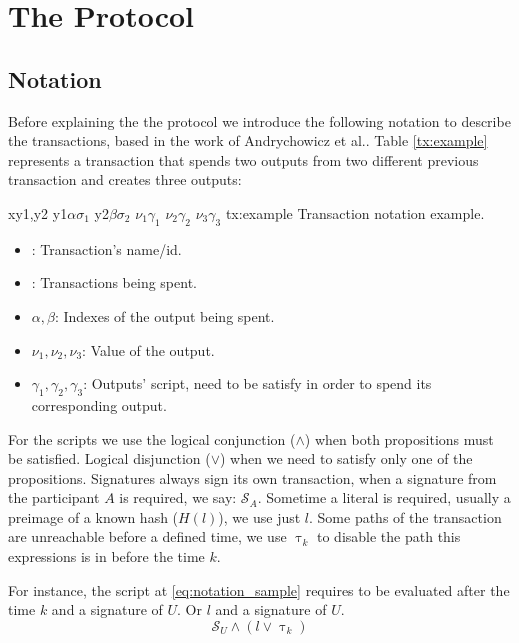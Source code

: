 \section{The Protocol}
\subsection{Notation}
Before explaining the the protocol we introduce the following notation to
  describe the transactions, based in the work of Andrychowicz et
  al.\cite{andrychowicz2014secure}.
Table \ref{tx:example} represents a transaction that spends two outputs from
  two different previous transaction and creates three outputs:

  \transaction
    {x}{y1,y2}
      {y1}{$\alpha$}{$\sigma_1$}
      {y2}{$\beta$}{$\sigma_2$}
      \stopinputs
      {$\nu_1$}{$\gamma_1$}
      {$\nu_2$}{$\gamma_2$}
      {$\nu_3$}{$\gamma_3$}
      \stopoutputs
      {tx:example}
      {Transaction notation example.}

\begin{itemize}
    \item {}: Transaction's name/id.
    \item {}: Transactions being spent.
    \item $\alpha,\beta$: Indexes of the output being spent.
    \item $\nu_1,\nu_2,\nu_3$: Value of the output.
    \item $\gamma_1, \gamma_2, \gamma_3$: Outputs' script, need to be satisfy
                                          in order to spend its corresponding
                                          output.
\end{itemize}

For the scripts we use the logical conjunction ($\wedge$) when both propositions
  must be satisfied.
Logical disjunction ($\vee$) when we need to satisfy only one of the
  propositions.
Signatures always sign its own transaction, when a signature from the
  participant $A$ is required, we say: $\mathcal{S}_A$.
Sometime a literal is required, usually a preimage of a known hash ($H(l)$), we
  use just $l$. Some paths of the transaction are unreachable before a defined
  time, we use $\uptau_k$ to disable the path this expressions is in before the
  time $k$.

For instance, the script at \ref{eq:notation_sample} requires to be evaluated
  after the time $k$ and a signature of $U$. Or $l$ and a signature of $U$.
\begin{equation} \label{eq:notation_sample}
    \mathcal{S}_U \wedge (l \vee \uptau_k)
\end{equation}
\mathmode




